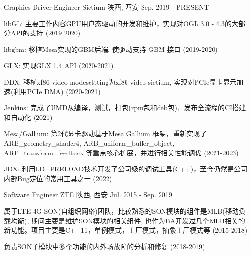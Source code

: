 
\begin{cventries}
  \cventry
    {Graphics Driver Engineer} %
    {Sietium} %
    {陕西, 西安} %
    {Sep. 2019 - PRESENT} %
    {
      \begin{cvitems} %
        \item {libGL: 主要工作内容GPU用户态驱动的开发和维护，实现对OGL 3.0 - 4.3的大部分API的支持 (2019-2020)}
        \item {libgbm: 移植Mesa实现的GBM后端, 使驱动支持 GBM 接口 (2019-2020)}
        \item {GLX: 实现GLX 1.4 API (2020-2021)}
        \item {DDX: 移植xf86-video-modesettting为xf86-video-sietium, 实现对PCIe显卡显示加速(利用PCIe DMA) (2020-2021)}
        \item {Jenkins: 完成了UMD从编译，测试，打包(rpm包和deb包)，发布全流程的CI搭建和自动化 (2021)}
        \item {\hspace{0.5cm}}
        \item {Mesa/Gallium: 第2代显卡驱动基于Mesa Gallium 框架，重新实现了ARB\_geometry\_shader4,  ARB\_uniform\_buffer\_object, ARB\_transform\_feedback 等重点核心扩展，并进行相关性能调优 (2021-2023)}
        \item {JDX: 利用LD\_PRELOAD技术开发了公司级的调试工具(C++)，至今仍然是公司内部Bug定位的常用工具之一 (2022)}
      \end{cvitems}
    }

  \cventry
    {Software Engineer} %
    {ZTE} %
    {陕西, 西安} %
    {Jul. 2015 - Sep. 2019} %
    {
      \begin{cvitems} %
      \item {属于LTE 4G SON(自组织网络)团队，比较熟悉的SON模块的组件是MLB(移动负载均衡), 期间主要是维护SON模块的相关组件, 也作为BA开发过几个MLB相关的新功能。项目主要是C++11，单例模式，工厂模式，抽象工厂模式等 (2015-2018)}
      \item {负责SON子模块中多个功能的内外场故障的分析和修复 (2018-2019)}
      \end{cvitems}
    }
\end{cventries}

